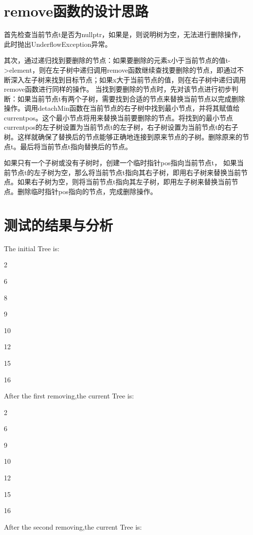 \documentclass[UTF8]{ctexart}
\begin{document}
\pagestyle{fancy}
\fancyhead{}

\section{remove函数的设计思路}
	首先检查当前节点t是否为nullptr，如果是，则说明树为空，无法进行删除操作，此时抛出UnderflowException异常。 

	其次，通过递归找到要删除的节点：如果要删除的元素x小于当前节点的值t->element，则在左子树中递归调用remove函数继续查找要删除的节点，即通过不断深入左子树来找到目标节点；如果x大于当前节点的值，则在右子树中递归调用remove函数进行同样的操作。
	当找到要删除的节点时，先对该节点进行初步判断：如果当前节点t有两个子树，需要找到合适的节点来替换当前节点以完成删除操作。调用detachMin函数在当前节点的右子树中找到最小节点，并将其赋值给currentpos。这个最小节点将用来替换当前要删除的节点。将找到的最小节点currentpos的左子树设置为当前节点t的左子树，右子树设置为当前节点t的右子树。这样就确保了替换后的节点能够正确地连接到原来节点的子树。删除原来的节点t。最后将当前节点t指向替换后的节点。
	
	如果只有一个子树或没有子树时，创建一个临时指针pos指向当前节点t，
如果当前节点t的左子树为空，那么将当前节点t指向其右子树，即用右子树来替换当前节点。如果右子树为空，则将当前节点t指向其左子树，即用左子树来替换当前节点。删除临时指针pos指向的节点，完成删除操作。

\section{测试的结果与分析}
 
The initial Tree is: 

2

6

8

9

10

12

15

16

After the first removing,the current Tree is:

2

6

9

10

12

15

16

After the second removing,the current Tree is:
\end{document}
